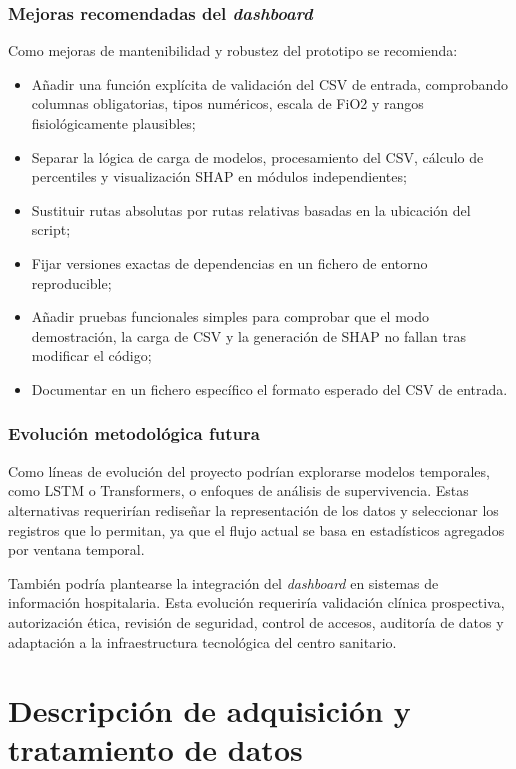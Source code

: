 \documentclass[
  spanish,
  a4paper,
  12pt,
  twoside]{memoir}
\newcommand{\apendice}[1]{\chapter{#1}}
\begin{document}
\subsection*{Mejoras recomendadas del \textit{dashboard}}

Como mejoras de mantenibilidad y robustez del prototipo se recomienda:

\begin{itemize}
  \item Añadir una función explícita de validación del CSV de entrada, comprobando columnas obligatorias, tipos numéricos, escala de FiO2 y rangos fisiológicamente plausibles;
  \item Separar la lógica de carga de modelos, procesamiento del CSV, cálculo de percentiles y visualización SHAP en módulos independientes;
  \item Sustituir rutas absolutas por rutas relativas basadas en la ubicación del script;
  \item Fijar versiones exactas de dependencias en un fichero de entorno reproducible;
  \item Añadir pruebas funcionales simples para comprobar que el modo demostración, la carga de CSV y la generación de SHAP no fallan tras modificar el código;
  \item Documentar en un fichero específico el formato esperado del CSV de entrada.
\end{itemize}

\subsection*{Evolución metodológica futura}

Como líneas de evolución del proyecto podrían explorarse modelos temporales, como LSTM o Transformers, o enfoques de análisis de supervivencia. Estas alternativas 
requerirían rediseñar la representación de los datos y seleccionar los registros que lo permitan, ya que el flujo actual se basa en estadísticos agregados por ventana temporal.

También podría plantearse la integración del \textit{dashboard} en sistemas de información hospitalaria. Esta evolución requeriría validación clínica prospectiva, 
autorización ética, revisión de seguridad, control de accesos, auditoría de datos y adaptación a la infraestructura tecnológica del centro sanitario.

\apendice{Descripción de adquisición y tratamiento de datos}
\end{document}
